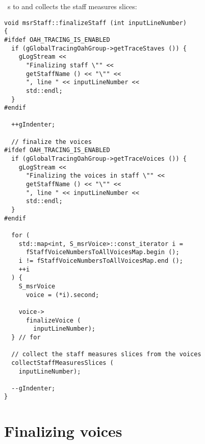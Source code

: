  \cascade\ s to  and collects the staff measures slices:
\begin{lstlisting}[language=CPlusPlus]
void msrStaff::finalizeStaff (int inputLineNumber)
{
#ifdef OAH_TRACING_IS_ENABLED
  if (gGlobalTracingOahGroup->getTraceStaves ()) {
    gLogStream <<
      "Finalizing staff \"" <<
      getStaffName () << "\"" <<
      ", line " << inputLineNumber <<
      std::endl;
  }
#endif

  ++gIndenter;

  // finalize the voices
#ifdef OAH_TRACING_IS_ENABLED
  if (gGlobalTracingOahGroup->getTraceVoices ()) {
    gLogStream <<
      "Finalizing the voices in staff \"" <<
      getStaffName () << "\"" <<
      ", line " << inputLineNumber <<
      std::endl;
  }
#endif

  for (
    std::map<int, S_msrVoice>::const_iterator i =
      fStaffVoiceNumbersToAllVoicesMap.begin ();
    i != fStaffVoiceNumbersToAllVoicesMap.end ();
    ++i
  ) {
    S_msrVoice
      voice = (*i).second;

    voice->
      finalizeVoice (
        inputLineNumber);
  } // for

  // collect the staff measures slices from the voices
  collectStaffMeasuresSlices (
    inputLineNumber);

  --gIndenter;
}
\end{lstlisting}


\section{Finalizing voices}

